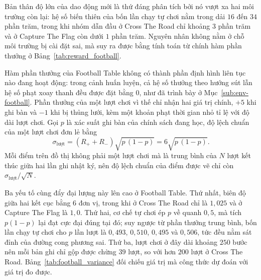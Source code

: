 \indent Bản thân độ lớn của dao động mới là thứ đáng phân tích bởi nó vượt xa hai môi trường
còn lại: hệ số biến thiên của bốn lần chạy tự chơi nằm trong dải $16$ đến $34$ phần trăm,
trong khi nhóm dẫn đầu ở Cross The Road chỉ khoảng $3$ phần trăm và ở Capture The Flag còn
dưới $1$ phần trăm. Nguyên nhân không nằm ở chỗ môi trường bị cài đặt sai, mà suy ra được
bằng tính toán từ chính hàm phần thưởng ở Bảng~\ref{tab:reward_football}.

\indent Hàm phần thưởng của Football Table không có thành phần định hình liên tục nào đang
hoạt động: trong cảnh huấn luyện, cả hệ số thưởng theo hướng sút lẫn hệ số phạt xoay thanh
đều được đặt bằng 0, như đã trình bày ở Mục~\ref{sub:env-football}. Phần thưởng của
một lượt chơi vì thế chỉ nhận hai giá trị chính, $+5$ khi ghi bàn và $-1$ khi bị thủng lưới,
kèm một khoản phạt thời gian nhỏ tỉ lệ với độ dài lượt chơi. Gọi $p$ là xác suất ghi bàn của
chính sách đang học, độ lệch chuẩn của một lượt chơi đơn lẻ bằng
\begin{equation}
\sigma_{\text{lượt}} = \left( R_{+} + R_{-} \right) \sqrt{p\,(1-p)} = 6\sqrt{p\,(1-p)} .
\label{eq:football-episode-std}
\end{equation}
Mỗi điểm trên đồ thị không phải một lượt chơi mà là trung bình của $N$ lượt kết thúc giữa hai
lần ghi nhật ký, nên độ lệch chuẩn của điểm được vẽ chỉ còn $\sigma_{\text{lượt}}/\sqrt{N}$.

\indent Ba yếu tố cùng đẩy đại lượng này lên cao ở Football Table. Thứ nhất, biên độ giữa hai
kết cục bằng $6$ đơn vị, trong khi ở Cross The Road chỉ là $1{,}025$ và ở Capture The Flag là
$1{,}0$. Thứ hai, cơ chế tự chơi ép $p$ về quanh $0{,}5$, mà tích $p(1-p)$ lại đạt cực đại
đúng tại đó; suy ngược từ phần thưởng trung bình, bốn lần chạy tự chơi cho $p$ lần lượt là
$0{,}493$, $0{,}510$, $0{,}495$ và $0{,}506$, tức đều nằm sát đỉnh của đường cong phương sai.
Thứ ba, lượt chơi ở đây dài khoảng $250$ bước nên mỗi bản ghi chỉ gộp được chừng $39$ lượt, so
với hơn $200$ lượt ở Cross The Road. Bảng~\ref{tab:football_variance} đối chiếu giá trị mà
công thức dự đoán với giá trị đo được.

